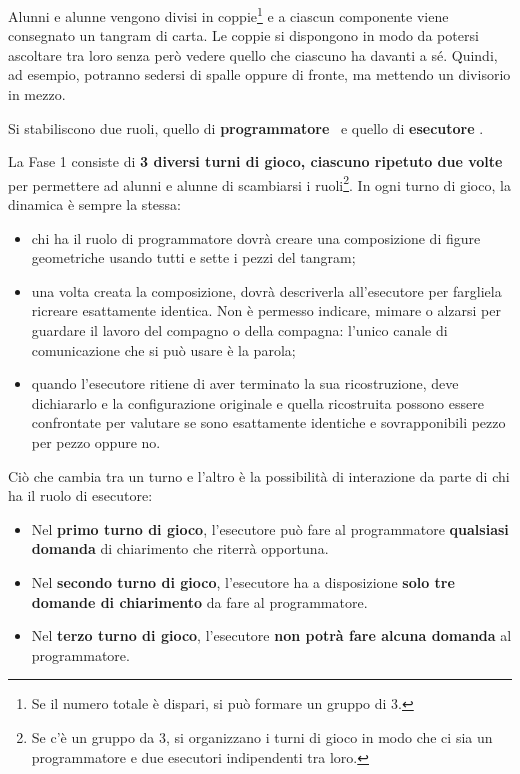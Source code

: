 Alunni e alunne vengono divisi in coppie\footnote{Se il numero totale è dispari, si può formare un gruppo di 3.} e a ciascun componente viene consegnato un tangram di carta. Le coppie si dispongono in modo da potersi ascoltare tra loro senza però vedere quello che ciascuno ha davanti a sé. Quindi, ad esempio, potranno sedersi di spalle oppure di fronte, ma mettendo un divisorio in mezzo.

Si stabiliscono due ruoli, quello di \textbf{programmatore} \guideiconProgrammatore\ e quello di \textbf{esecutore} \guideiconEsecutore.

La Fase 1 consiste di \textbf{3 diversi turni di gioco, ciascuno ripetuto due volte} per permettere ad alunni e alunne di scambiarsi i ruoli\footnote{Se c'è un gruppo da 3, si organizzano i turni di gioco in modo che ci sia un programmatore e due esecutori indipendenti tra loro.}. In ogni turno di gioco, la dinamica è sempre la stessa:

\begin{itemize}
\item
  chi ha il ruolo di programmatore dovrà creare una composizione di figure geometriche usando tutti e sette i pezzi del tangram;
\item
  una volta creata la composizione, dovrà descriverla all'esecutore per fargliela ricreare esattamente identica. Non è permesso indicare, mimare o alzarsi per guardare il lavoro del compagno o della compagna: l'unico canale di comunicazione che si può usare è la parola;
\item
  quando l'esecutore ritiene di aver terminato la sua ricostruzione, deve dichiararlo e la configurazione originale e quella ricostruita possono essere confrontate per valutare se sono esattamente identiche e sovrapponibili pezzo per pezzo oppure no.
\end{itemize}

Ciò che cambia tra un turno e l'altro è la possibilità di interazione da parte di chi ha il ruolo di esecutore:

\begin{itemize}
\item
  Nel \textbf{primo turno di gioco}, l'esecutore può fare al programmatore \textbf{qualsiasi domanda} di chiarimento che riterrà opportuna.
\item
  Nel \textbf{secondo turno di gioco}, l'esecutore ha a disposizione \textbf{solo tre domande di chiarimento} da fare al programmatore.
\item
  Nel \textbf{terzo turno di gioco}, l'esecutore \textbf{non potrà fare alcuna domanda} al programmatore.
\end{itemize}

